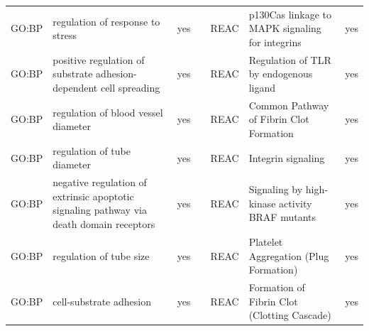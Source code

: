 \begin{longtable}{@{}lp{4cm}lllp{4cm}l@{}}
GO:BP           & regulation of response to stress                                                                                                   & yes              &           & REAC            & p130Cas linkage to MAPK signaling for integrins                                                                                                                        & yes              \\
GO:BP           & positive regulation of substrate adhesion-dependent cell spreading                      & yes              &           & REAC            & Regulation of TLR by endogenous ligand                                                                                                                                 & yes              \\
GO:BP           & regulation of blood vessel diameter                                                                                                & yes              &           & REAC            & Common Pathway of Fibrin Clot Formation                                                                                                                                & yes              \\
GO:BP           & regulation of tube diameter                                                                                                        & yes              &           & REAC            & Integrin signaling                                                                                                                                                     & yes              \\
GO:BP           & negative regulation of extrinsic apoptotic signaling pathway via death domain receptors & yes              &           & REAC            & Signaling by high-kinase activity BRAF mutants                                                                                                                         & yes              \\
GO:BP           & regulation of tube size                                                                                                            & yes              &           & REAC            & Platelet Aggregation (Plug Formation)                                                                                                                                  & yes              \\
GO:BP           & cell-substrate adhesion                                                                                                            & yes              &           & REAC            & Formation of Fibrin Clot (Clotting Cascade)                                                                                                                            & yes              \\

\end{longtable}
